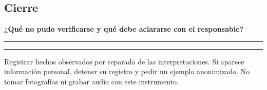 \subsection*{Cierre}
\textbf{¿Qué no pudo verificarse y qué debe aclararse con el responsable?}

\medskip\noindent\rule{\linewidth}{0.4pt}\par\medskip
\noindent\rule{\linewidth}{0.4pt}

\medskip
Registrar hechos observados por separado de las interpretaciones. Si aparece información
personal, detener su registro y pedir un ejemplo anonimizado. No tomar fotografías ni grabar
audio con este instrumento.
\endgroup
